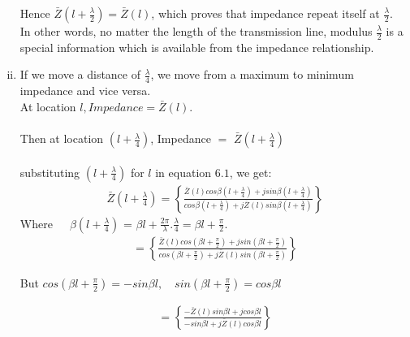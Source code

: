 \begin{enumerate}[(i)]
Hence $\bar{Z}\left(l+\frac{\lambda}{2}\right)
=\bar{Z}(l)$, which proves that impedance repeat itself at $\frac{\lambda}{2}$.\\

In other words, no matter the length of the transmission line, modulus $\frac{\lambda}{2}$ is  a special information which is available from the impedance relationship.
\item If we move a distance of $\frac{\lambda}{4}$, we move from a maximum to minimum impedance and vice versa.\\

At location $l , Impedance =\bar{Z}(l).$\\\\
Then at location ${(l+\frac{\lambda}{4})}$, Impedance  $=$ $\bar{Z}(l+\frac{\lambda}{4})$\\\\
substituting ${(l+\frac{\lambda}{4})}$ for $l$ in equation $6.1$, we get:
\begin{align*}
\bar{Z}(l+\frac{\lambda}{4}) = \left\lbrace \frac{\bar{Z}(l)cos\beta (l+\frac{\lambda}{4}) + jsin\beta (l+\frac{\lambda}{4})}{cos\beta (l+\frac{\lambda}{4}) + j\bar{Z}(l)sin\beta (l+\frac{\lambda}{4})}\right\rbrace 
\end{align*}
Where\ \ \  $\beta( l + \frac{\lambda}{4})$ = $\beta l + \frac{2\pi}{\lambda} . \frac{\lambda}{4} = \beta l + \frac{\pi}{2}.$
\begin{align*} 
= \left\lbrace \frac{\bar{Z}(l)cos(\beta l + \frac{\pi}{2}) + jsin(\beta l + \frac{\pi}{2})}{cos (\beta l + \frac{\pi}{2}) + j\bar{Z}(l)sin(\beta l + \frac{\pi}{2})}\right\rbrace
\end{align*}

But $cos(\beta l + \frac{\pi}{2})= -sin\beta l , \quad sin(\beta l +\frac{\pi}{2})= cos\beta l$

\begin{align*} 
= \left\lbrace \frac{-\bar{Z}(l)sin\beta l + jcos\beta l}{-sin\beta l + j\bar{Z}(l) cos\beta l}\right\rbrace
\end{align*}


\end{enumerate}
